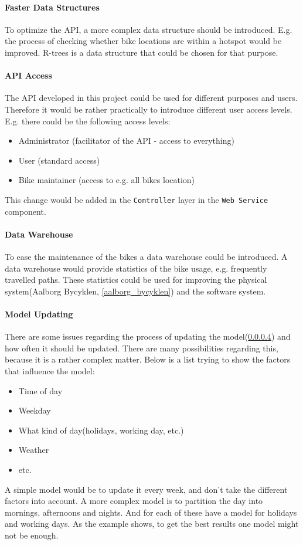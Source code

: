 \paragraph{Faster Data Structures}
To optimize the API, a more complex data structure should be introduced.
E.g. the process of checking whether bike locations are within a hotspot would be improved.
R-trees\cite[Section 25.3.5.3]{database_system_concepts} is a data structure that could be chosen for that purpose.

\paragraph{API Access}
The API developed in this project could be used for different purposes and users.
Therefore it would be rather practically to introduce different user access levels.
E.g. there could be the following access levels:
\begin{itemize}
\item Administrator (facilitator of the API - access to everything)
\item User (standard access)
\item Bike maintainer (access to e.g. all bikes location)
\end{itemize}
This change would be added in the \texttt{Controller} layer in the \texttt{Web Service} component.

\paragraph{Data Warehouse \cite{data_warehousing}}
To ease the maintenance of the bikes a data warehouse could be introduced.
A data warehouse would provide statistics of the bike usage, e.g. frequently travelled paths.
These statistics could be used for improving the physical system(Aalborg Bycyklen, \cref{aalborg_bycyklen}) and the software system.

\paragraph{Model Updating}
There are some issues regarding the process of updating the model(\cref{}) and how often it should be updated.
There are many possibilities regarding this, because it is a rather complex matter.
Below is a list trying to show the factors that influence the model:
\begin{itemize}
\item Time of day
\item Weekday
\item What kind of day(holidays, working day, etc.)
\item Weather
\item etc.
\end{itemize}
A simple model would be to update it every week, and don't take the different factors into account.
A more complex model is to partition the day into mornings, afternoons and nights.
And for each of these have a model for holidays and working days.
As the example shows, to get the best results one model might not be enough.

